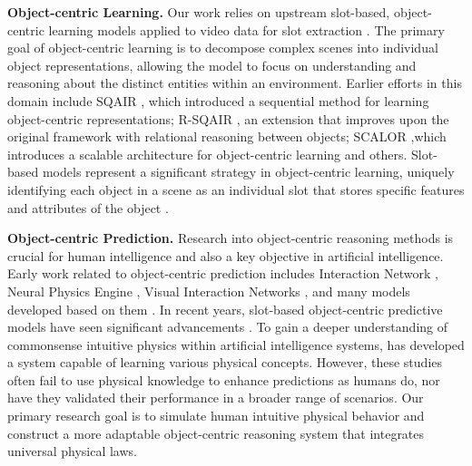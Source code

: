 \documentclass[sigconf]{acmart}
\begin{document}
\textbf{Object-centric Learning.} Our work relies on upstream slot-based, object-centric learning models applied to video data for slot extraction \cite{kipf2021conditional, elsayed2022savi++, singh2022simple, li2024reasoningenhanced}. The primary goal of object-centric learning is to decompose complex scenes into individual object representations, allowing the model to focus on understanding and reasoning about the distinct entities within an environment. Earlier efforts in this domain include SQAIR \cite{kosiorek2018sequential}, which introduced a sequential method for learning object-centric representations; R-SQAIR \cite{stanic2019r}, an extension that improves upon the original framework with relational reasoning between objects; SCALOR \cite{jiang2019scalor},which introduces a scalable architecture for object-centric learning and others\cite{burgess2019monet, veerapaneni2020entity, weis2020unmasking, bear2020learning, kabra2021simone}. Slot-based models represent a significant strategy in object-centric learning, uniquely identifying each object in a scene as an individual slot that stores specific features and attributes of the object \cite{kumar2020ma, yang2021self, dittadi2021generalization, hassanin2022visual, wu2023SlotFormer}.

\textbf{Object-centric Prediction.} Research into object-centric reasoning methods is crucial for human intelligence and also a key objective in artificial intelligence. Early work related to object-centric prediction includes Interaction Network \cite{battaglia2016interaction}, Neural Physics Engine \cite{chang2016compositional}, Visual Interaction Networks \cite{watters2017visual}, and many models developed based on them \cite{chen2021roots, jusup2022social, meng2022physics, piloto2022intuitive, singh2022simple, driess2023learning}. In recent years, slot-based object-centric predictive models have seen significant advancements \cite{ding2021dynamic, ding2021attention, wu2023SlotFormer}. To gain a deeper understanding of commonsense intuitive physics within artificial intelligence systems, \cite{piloto2022intuitive} has developed a system capable of learning various physical concepts. However, these studies often fail to use physical knowledge to enhance predictions as humans do, nor have they validated their performance in a broader range of scenarios. Our primary research goal is to simulate human intuitive physical behavior and construct a more adaptable object-centric reasoning system that integrates universal physical laws.
\end{document}

